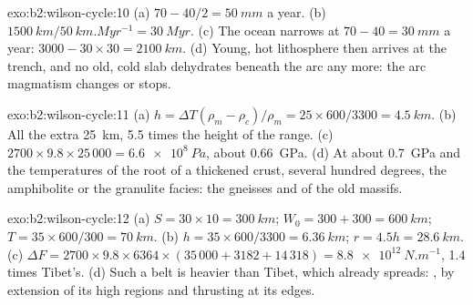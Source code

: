 \begin{solution}{exo:b2:wilson-cycle:10}
(a) $70 - 40/2 = \qty{50}{mm}$ a year. (b) $\qty{1500}{km}/\qty{50}{km.Myr^{-1}} =
\qty{30}{Myr}$. (c) The ocean narrows at $70 - 40 = \qty{30}{mm}$ a year: $3000 - 30\times30 =
\qty{2100}{km}$. (d) Young, hot lithosphere then arrives at the trench, and no old, cold slab
dehydrates beneath the arc any more: the arc magmatism changes or stops.
\end{solution}

\begin{solution}{exo:b2:wilson-cycle:11}
(a) $h = \Delta T(\rho_m - \rho_c)/\rho_m = 25\times600/3300 = \qty{4.5}{km}$. (b) All the extra
\qty{25}{km}, 5.5 times the height of the range. (c) $2700\times9.8\times25\,000 =
\qty{6.6e8}{Pa}$, about \qty{0.66}{GPa}. (d) At about \qty{0.7}{GPa} and the temperatures of
the root of a thickened crust, several hundred degrees, the amphibolite or the granulite
facies: the gneisses and  of the old massifs.
\end{solution}

\begin{solution}{exo:b2:wilson-cycle:12}
(a) $S = 30\times10 = \qty{300}{km}$; $W_0 = 300 + 300 = \qty{600}{km}$; $T = 35\times600/300 =
\qty{70}{km}$. (b) $h = 35\times600/3300 = \qty{6.36}{km}$; $r = 4.5h = \qty{28.6}{km}$.
(c) $\Delta F = 2700\times9.8\times6364\times(35\,000 + 3182 + 14\,318) =
\qty{8.8e12}{N.m^{-1}}$, 1.4 times Tibet's. (d) Such a belt is heavier than Tibet, which already
spreads: , by extension of its high regions and thrusting at its edges.
\end{solution}

